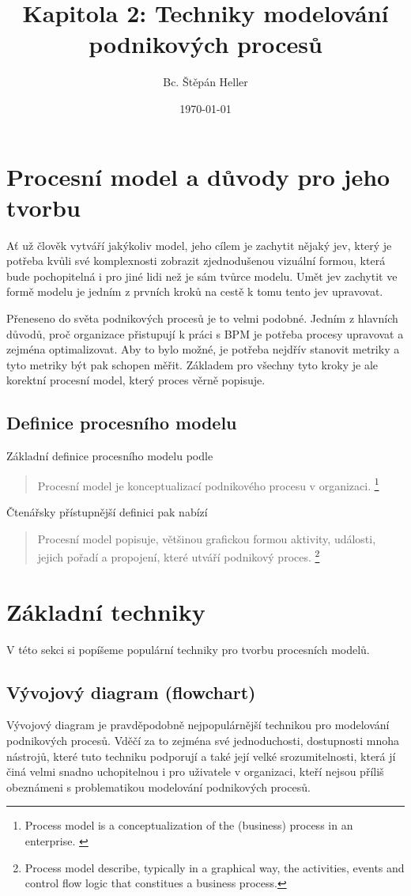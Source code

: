 \documentclass[]{article}
\begin{document}
\title{Kapitola 2: Techniky modelování podnikových procesů}
\author{Bc. Štěpán Heller}
\date{\today}
\maketitle

\section{Procesní model a důvody pro jeho tvorbu}
Ať už člověk vytváří jakýkoliv model, jeho cílem je zachytit nějaký jev, který je potřeba kvůli své komplexnosti zobrazit zjednodušenou vizuální formou, která bude pochopitelná i pro jiné lidi než je sám tvůrce modelu. Umět jev zachytit ve formě modelu je jedním z prvních kroků na cestě k tomu tento jev upravovat.

Přeneseno do světa podnikových procesů je to velmi podobné. Jedním z hlavních důvodů, proč organizace přistupují k práci s BPM je potřeba procesy upravovat a zejména optimalizovat. Aby to bylo možné, je potřeba nejdřív stanovit metriky a tyto metriky být pak schopen měřit. Základem pro všechny tyto kroky je ale korektní procesní model, který proces věrně popisuje.

\subsection{Definice procesního modelu}
Základní definice procesního modelu podle 
\begin{quote}
Procesní model je konceptualizací podnikového procesu v organizaci.
\footnote{Process model is a conceptualization of the (business) process in an enterprise. \cite{Dietz2006}}
\end{quote}
Čtenářsky přístupnější definici pak nabízí \cite{Recker2009}
\begin{quote}
Procesní model popisuje, většinou grafickou formou aktivity, události, jejich pořadí a propojení, které utváří podnikový proces.
\footnote{Process model describe, typically in a graphical way, the activities, events and control flow logic that constitues a business process.}
\end{quote}

\section{Základní techniky}
V této sekci si popíšeme populární techniky pro tvorbu procesních modelů.
\subsection{Vývojový diagram (flowchart)}
Vývojový diagram je pravděpodobně nejpopulárnější technikou pro modelování podnikových procesů. Vděčí za to zejména své jednoduchosti, dostupnosti mnoha nástrojů, které tuto techniku podporují a také její velké srozumitelnosti, která jí činá velmi snadno uchopitelnou i pro uživatele v organizaci, kteří nejsou příliš obeznámeni s problematikou modelování podnikových procesů.
\end{document}
